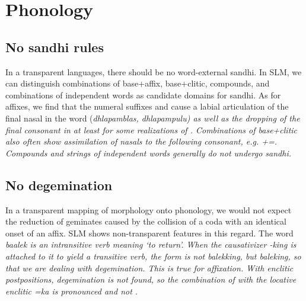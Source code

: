 \documentclass[a4paper]{article}
\begin{document}

\section{Phonology}
\subsection{No sandhi rules}

In a transparent languages, there should be no word-external sandhi. In SLM, we can distinguish combinations of base+affix, base+clitic, compounds, and combinations of independent words as candidate domains for sandhi. As for affixes, we find that the numeral suffixes  and  cause a labial articulation of the final nasal in the word  (\em dhlapamblas, dhlapampulu\em) as well as the dropping of the final consonant in  at least for some realizations of . Combinations of base+clitic also often show assimilation of nasals to the following consonant, e.g. +=. Compounds and strings of independent words generally do not undergo sandhi.


\subsection{No degemination}
In a transparent mapping of morphology onto phonology, we would not expect the reduction of geminates caused by the collision of a coda with an identical onset of an affix. SLM shows non-transparent features in this regard. The word \em baalek \em is an intransitive verb meaning  `to return'. When the causativizer \em -king \em is attached to it to yield a transitive verb, the form is not \em balekking\em, but \em baleking\em, so that we are dealing with degemination. This is true for affixation. With enclitic postpositions, degemination is not found, so the combination of  with the locative enclitic \em =ka \em is pronounced  and not .
\end{document}
